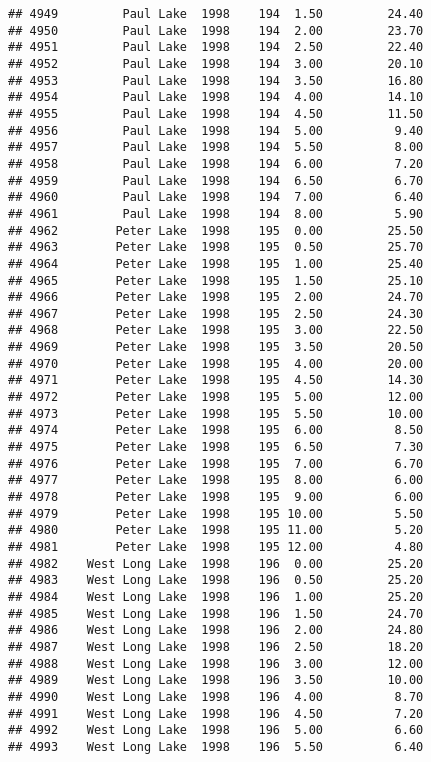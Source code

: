 \documentclass[
]{article}
\begin{document}
\begin{verbatim}
## 4949         Paul Lake  1998    194  1.50         24.40
## 4950         Paul Lake  1998    194  2.00         23.70
## 4951         Paul Lake  1998    194  2.50         22.40
## 4952         Paul Lake  1998    194  3.00         20.10
## 4953         Paul Lake  1998    194  3.50         16.80
## 4954         Paul Lake  1998    194  4.00         14.10
## 4955         Paul Lake  1998    194  4.50         11.50
## 4956         Paul Lake  1998    194  5.00          9.40
## 4957         Paul Lake  1998    194  5.50          8.00
## 4958         Paul Lake  1998    194  6.00          7.20
## 4959         Paul Lake  1998    194  6.50          6.70
## 4960         Paul Lake  1998    194  7.00          6.40
## 4961         Paul Lake  1998    194  8.00          5.90
## 4962        Peter Lake  1998    195  0.00         25.50
## 4963        Peter Lake  1998    195  0.50         25.70
## 4964        Peter Lake  1998    195  1.00         25.40
## 4965        Peter Lake  1998    195  1.50         25.10
## 4966        Peter Lake  1998    195  2.00         24.70
## 4967        Peter Lake  1998    195  2.50         24.30
## 4968        Peter Lake  1998    195  3.00         22.50
## 4969        Peter Lake  1998    195  3.50         20.50
## 4970        Peter Lake  1998    195  4.00         20.00
## 4971        Peter Lake  1998    195  4.50         14.30
## 4972        Peter Lake  1998    195  5.00         12.00
## 4973        Peter Lake  1998    195  5.50         10.00
## 4974        Peter Lake  1998    195  6.00          8.50
## 4975        Peter Lake  1998    195  6.50          7.30
## 4976        Peter Lake  1998    195  7.00          6.70
## 4977        Peter Lake  1998    195  8.00          6.00
## 4978        Peter Lake  1998    195  9.00          6.00
## 4979        Peter Lake  1998    195 10.00          5.50
## 4980        Peter Lake  1998    195 11.00          5.20
## 4981        Peter Lake  1998    195 12.00          4.80
## 4982    West Long Lake  1998    196  0.00         25.20
## 4983    West Long Lake  1998    196  0.50         25.20
## 4984    West Long Lake  1998    196  1.00         25.20
## 4985    West Long Lake  1998    196  1.50         24.70
## 4986    West Long Lake  1998    196  2.00         24.80
## 4987    West Long Lake  1998    196  2.50         18.20
## 4988    West Long Lake  1998    196  3.00         12.00
## 4989    West Long Lake  1998    196  3.50         10.00
## 4990    West Long Lake  1998    196  4.00          8.70
## 4991    West Long Lake  1998    196  4.50          7.20
## 4992    West Long Lake  1998    196  5.00          6.60
## 4993    West Long Lake  1998    196  5.50          6.40

\end{verbatim}
\end{document}
